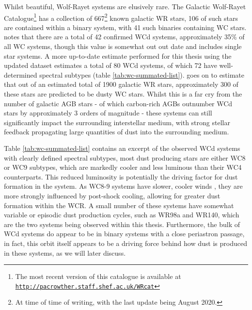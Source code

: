 Whilst beautiful, Wolf-Rayet systems are elusively rare.
The Galactic Wolf-Rayet Catalogue\footnote{The most recent version of this catalogue is available at \texttt{\href{http://pacrowther.staff.shef.ac.uk/WRcat}{http://pacrowther.staff.shef.ac.uk/WRcat}}} \parencite{rossloweSpatialDistributionGalactic2015} has a collection of 667\footnote{At time of time of writing, with the last update being August 2020.} known galactic WR stars, 106 of such stars are contained within a binary system, with 41 such binaries containing WC stars.
\textcite{rossloweSpatialDistributionGalactic2015} notes that there are a total of 42 confirmed WCd systems, approximately 35\% of all WC systems, though this value is somewhat out out date and includes single star systems.
A more up-to-date estimate performed for this thesis using the updated dataset estimates a total of 80 WCd systems, of which 72 have well-determined spectral subtypes (table \ref{tab:wc-summated-list}).
\textcite{rossloweSpatialDistributionGalactic2015} goes on to estimate that out of an estimated total of 1900 galactic WR stars, approximately 300 of these stars are predicted to be dusty WC stars.
Whilst this is a far cry from the number of galactic AGB stars - of which carbon-rich AGBs outnumber WCd stars by approximately 3 orders of magnitude \parencite{ishiharaGalacticDistributionsCarbon2011} - these systems can still significantly impact the surrounding interstellar medium, with strong stellar feedback propagating large quantities of dust into the surrounding medium.

Table \ref{tab:wc-summated-list} contains an excerpt of the observed WCd systems with clearly defined spectral subtypes, most dust producing stars are either WC8 or WC9 subtypes, which are markedly cooler and less luminous than their WC4 counterparts.
This reduced luminosity is potentially the driving factor for dust formation in the system.
As WC8-9 systems have slower, cooler winds \parencite{niedzielskiKinematicalStructureWolfRayet2002}, they are more strongly influenced by post-shock cooling, allowing for greater dust formation within the WCR.
A small number of these systems have somewhat variable or episodic dust production cycles, such as WR98a and WR140, which are the two systems being observed within this thesis.
Furthermore, the bulk of WCd systems do appear to be in binary systems with a close periastron passage, in fact, this orbit itself appears to be a driving force behind how dust is produced in these systems, as we will later discuss.

